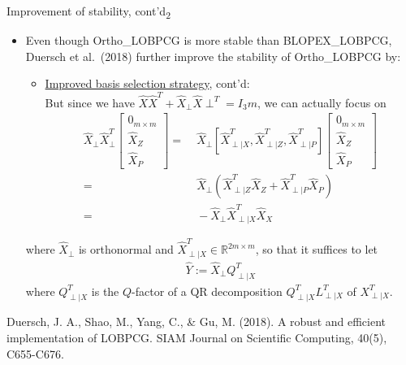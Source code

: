 \documentclass[t,usepdftitle=false]{beamer}
\begin{document}
\begin{frame}{Improvement of stability, cont'd\textsubscript{2}}
	\begin{itemize}
		\item Even though Ortho\_LOBPCG is more stable than BLOPEX\_LOBPCG, Duersch et al.~(2018) further improve the stability of Ortho\_LOBPCG by:
		\begin{itemize}
			\item\underline{Improved basis selection strategy}, cont'd:\tinyskip\\
			But since we have $\hat{X}\hat{X}^T+\hat{X}_\perp\hat{X}\perp^T=I_3m$, we can actually focus on 
			\begin{align*}
			\hat{X}_\perp\hat{X}_\perp^T\begin{bmatrix}0_{m\times m}\\\hat{X}_Z\\\hat{X}_P\end{bmatrix}
			=&\;
			\hat{X}_\perp[\hat{X}_{\perp|X}^T,\hat{X}_{\perp|Z}^T,\hat{X}_{\perp|P}^T]\begin{bmatrix}0_{m\times m}\\\hat{X}_Z\\\hat{X}_P\end{bmatrix}\\
			=&\;
			\hat{X}_\perp\left(\hat{X}_{\perp|Z}^T\hat{X}_Z+\hat{X}_{\perp|P}^T\hat{X}_P\right)\\
			=&\;
			-\hat{X}_\perp\hat{X}_{\perp|X}^T\hat{X}_X
			\end{align*}
		\end{itemize}
	where $\hat{X}_\perp$ is orthonormal and $\hat{X}_{\perp|X}^T\in\mathbb{R}^{2m\times m}$, so that it suffices to let 
	\begin{align*}
	\hat{Y}:=\hat{X}_\perp Q_{\perp|X}^T
	\end{align*} 
    where $Q^T_{\perp|X}$ is the $Q$-factor of a QR decomposition $Q^T_{\perp|X}L^T_{\perp|X}$ of $X^T_{\perp|X}$.
	\end{itemize}	
	\medskip
	\tiny{Duersch, J. A., Shao, M., Yang, C., \& Gu, M. (2018). A robust and efficient implementation of LOBPCG. SIAM Journal on Scientific Computing, 40(5), C655-C676.}
\end{frame}
\end{document}
